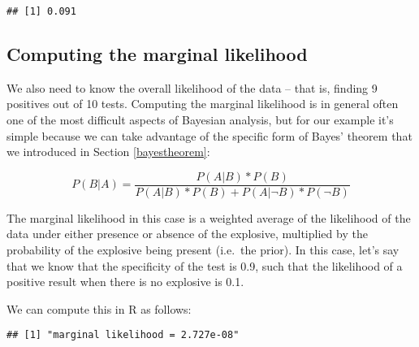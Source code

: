\documentclass[]{book}
\newenvironment{Shaded}{\begin{snugshade}}{\end{snugshade}}
\newcommand{\KeywordTok}[1]{\textcolor[rgb]{0.13,0.29,0.53}{\textbf{#1}}}
\newcommand{\DecValTok}[1]{\textcolor[rgb]{0.00,0.00,0.81}{#1}}
\newcommand{\FloatTok}[1]{\textcolor[rgb]{0.00,0.00,0.81}{#1}}
\newcommand{\StringTok}[1]{\textcolor[rgb]{0.31,0.60,0.02}{#1}}
\newcommand{\CommentTok}[1]{\textcolor[rgb]{0.56,0.35,0.01}{\textit{#1}}}
\newcommand{\OperatorTok}[1]{\textcolor[rgb]{0.81,0.36,0.00}{\textbf{#1}}}
\newcommand{\NormalTok}[1]{#1}
\theoremstyle{definition}
\theoremstyle{definition}
\theoremstyle{definition}
\theoremstyle{remark}
\begin{document}
\begin{verbatim}
## [1] 0.091
\end{verbatim}

\subsection{Computing the marginal
likelihood}\label{computing-the-marginal-likelihood}

We also need to know the overall likelihood of the data -- that is,
finding 9 positives out of 10 tests. Computing the marginal likelihood
is in general often one of the most difficult aspects of Bayesian
analysis, but for our example it's simple because we can take advantage
of the specific form of Bayes' theorem that we introduced in Section
\ref{bayestheorem}:

\[
P(B|A) = \frac{P(A|B)*P(B)}{P(A|B)*P(B) + P(A|\neg B)*P(\neg B)}
\]

The marginal likelihood in this case is a weighted average of the
likelihood of the data under either presence or absence of the
explosive, multiplied by the probability of the explosive being present
(i.e.~the prior). In this case, let's say that we know that the
specificity of the test is 0.9, such that the likelihood of a positive
result when there is no explosive is 0.1.

We can compute this in R as follows:

\begin{Shaded}
\end{Shaded}

\begin{verbatim}
## [1] "marginal likelihood = 2.727e-08"
\end{verbatim}
\end{document}
